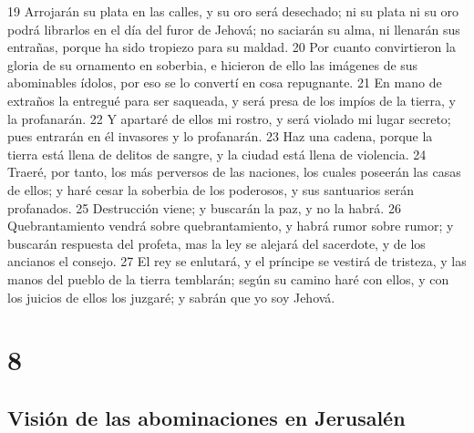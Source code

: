 19 Arrojarán su plata en las calles, y su oro será desechado; ni su plata ni su oro podrá librarlos en el día del furor de Jehová; no saciarán su alma, ni llenarán sus entrañas, porque ha sido tropiezo para su maldad.
20 Por cuanto convirtieron la gloria de su ornamento en soberbia, e hicieron de ello las imágenes de sus abominables ídolos, por eso se lo convertí en cosa repugnante.
21 En mano de extraños la entregué para ser saqueada, y será presa de los impíos de la tierra, y la profanarán.
22 Y apartaré de ellos mi rostro, y será violado mi lugar secreto; pues entrarán en él invasores y lo profanarán.
23 Haz una cadena, porque la tierra está llena de delitos de sangre, y la ciudad está llena de violencia.
24 Traeré, por tanto, los más perversos de las naciones, los cuales poseerán las casas de ellos; y haré cesar la soberbia de los poderosos, y sus santuarios serán profanados.
25 Destrucción viene; y buscarán la paz, y no la habrá.
26 Quebrantamiento vendrá sobre quebrantamiento, y habrá rumor sobre rumor; y buscarán respuesta del profeta, mas la ley se alejará del sacerdote, y de los ancianos el consejo.
27 El rey se enlutará, y el príncipe se vestirá de tristeza, y las manos del pueblo de la tierra temblarán; según su camino haré con ellos, y con los juicios de ellos los juzgaré; y sabrán que yo soy Jehová.

\chapter{8}

\section*{Visión de las abominaciones en Jerusalén}

